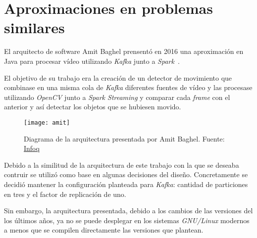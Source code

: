 \section{Aproximaciones en problemas similares}

El arquitecto de software Amit Baghel prensentó en 2016 una aproximación en Java para procesar vídeo utilizando \textit{Kafka} junto a \textit{Spark}~\cite{amit2017kafka}.

El objetivo de su trabajo era la creación de un detector de movimiento que combinase en una misma cola de \textit{Kafka} diferentes fuentes de vídeo y las procesase utilizando \textit{OpenCV} junto a \textit{Spark Streaming} y comparar cada \textit{frame} con el anterior y así detectar los objetos que se hubiesen movido.

\begin{figure}[h]
	\centering
	\texttt{[image: amit]}
	\caption[Diagrama de la arquitectura presentada por Amit Baghel.]{Diagrama de la arquitectura presentada por Amit Baghel. Fuente: \href{https://www.infoq.com/articles/video-stream-analytics-opencv/}{Infoq}}
\end{figure}

Debido a la similitud de la arquitectura de este trabajo con la que se deseaba contruir se utilizó como base en algunas decisiones del diseño. Concretamente se decidió mantener la configuración planteada para \textit{Kafka}: cantidad de particiones  en tres y el factor de replicación de uno.

Sin embargo, la arquitectura presentada, debido a los cambios de las versiones del los últimos años, ya no se puede desplegar en los sistemas \textit{GNU/Linux} modernos a menos que se compilen directamente las versiones que plantean.